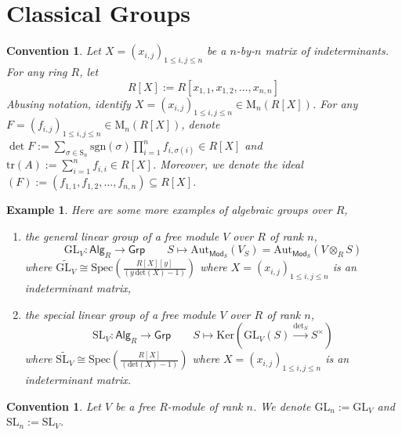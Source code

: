 \documentclass[10pt]{book}
\theoremstyle{bookplain}
\theoremstyle{bookdefinition}
\newtheorem{example}[theorem]{Example}
\theoremstyle{bookremark}
\newtheorem{convention}[theorem]{Convention}
\begin{document}
\section{Classical Groups}
\begin{convention}Let $X=(x_{i,j})_{1\le i,j\le n}$ be a $n$-by-$n$ matrix of indeterminants. For any ring $R$, let
    \[R[X]:=R[x_{1,1},x_{1,2},\dots,x_{n,n}]\]
    Abusing notation, identify $X=(x_{i,j})_{1\le i,j\le n}\in \mathrm M_n(R[X])$. For any $F=(f_{i,j})_{1\le i,j\le n}\in\mathrm M_n(R[X])$, denote $\det F:=\sum_{\sigma\in \mathrm S_n}\mathrm{sgn}(\sigma)\prod_{i=1}^n f_{i,\sigma(i)}\in R[X]$ and $\mathrm{tr}(A):=\sum_{i=1}^n f_{i,i}\in R[X]$. 
    Moreover, we denote the ideal $(F):=(f_{1,1},f_{1,2},\dots,f_{n,n})\subseteq R[X]$. 
\end{convention}
\begin{example}\label{eg:alggroup}
    Here are some more examples of algebraic groups over $R$,
\begin{enumerate}
    \item the \textit{general linear group} of a free module $V$ over $R$ of rank $n$,
    \[\mathrm{GL}_V:\mathsf{Alg}_R\rightarrow\mathsf{Grp}\qquad S\mapsto \mathrm{Aut}_{\mathsf{Mod}_S}(V_S)=\mathrm{Aut}_{\mathsf{Mod}_S}(V\otimes_{R}S)\]
    where $\displaystyle\widetilde{\mathrm{GL}_V}\cong \mathrm{Spec}\left(\frac{R[X][y]}{(y\,\mathrm{det}(X)-1)}\right)$ where $X=(x_{i,j})_{1\le i,j\le n}$ is an indeterminant matrix,
    \item the \textit{special linear group} of a free module $V$ over $R$ of rank $n$,
    \[\mathrm{SL}_V:\mathsf{Alg}_R\rightarrow\mathsf{Grp}\qquad S\mapsto \mathrm{Ker}\left(\mathrm{GL}_V(S)\xrightarrow{\mathrm{det}_S}S^\times\right)\]
    where $\displaystyle\widetilde{\mathrm{SL}_V}\cong \mathrm{Spec}\left(\frac{R[X]}{(\mathrm{det}(X)-1)}\right)$ where $X=(x_{i,j})_{1\le i,j\le n}$ is an indeterminant matrix.
    \end{enumerate}
\end{example}

\begin{convention}Let $V$ be a free $R$-module of rank $n$. We denote $\mathrm{GL}_n:=\mathrm{GL}_V$ and $\mathrm{SL}_n:=\mathrm{SL}_V$. 
\end{convention}
\end{document}
